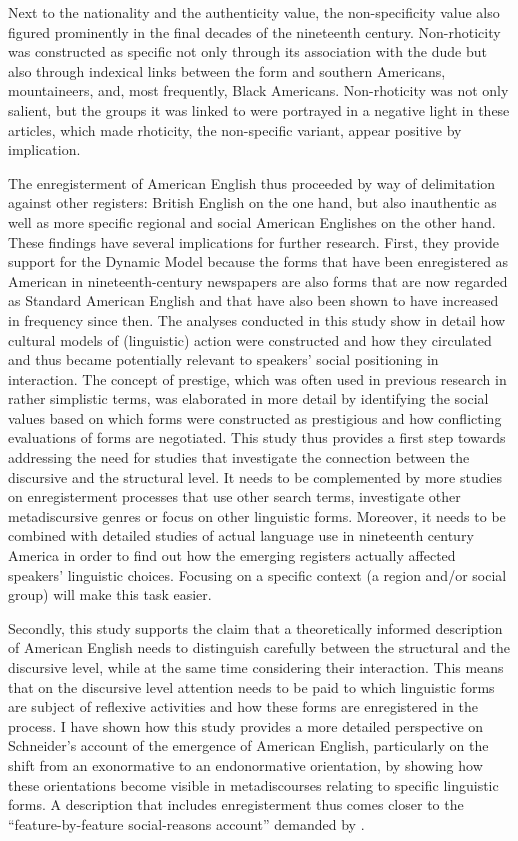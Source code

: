Next to the nationality and the authenticity value, the non-specificity value also figured prominently in the final decades of the nineteenth century. Non-rhoticity was constructed as specific not only through its association with the dude but also through indexical links between the form and southern Americans, mountaineers, and, most frequently, Black Americans. Non-rhoticity was not only salient, but the groups it was linked to were portrayed in a negative light in these articles, which made rhoticity, the non-specific variant, appear positive by implication.

The enregisterment of American English thus proceeded by way of delimitation against other registers: British English on the one hand, but also inauthentic as well as more specific regional and social American Englishes on the other hand. These findings have several implications for further research. First, they provide support for the Dynamic Model because the forms that have been enregistered as American in nineteenth-century newspapers are also forms that are now regarded as Standard American English and that have also been shown to have increased in frequency since then. The analyses conducted in this study show in detail how cultural models of (linguistic) action were constructed and how they circulated and thus became potentially relevant to speakers’ social positioning in interaction. The concept of prestige, which was often used in previous research in rather simplistic terms, was elaborated in more detail by identifying the social values based on which forms were constructed as prestigious and how conflicting evaluations of forms are negotiated. This study thus provides a first step towards addressing the need for studies that investigate the connection between the discursive and the structural level. It needs to be complemented by more studies on enregisterment processes that use other search terms, investigate other metadiscursive genres or focus on other linguistic forms. Moreover, it needs to be combined with detailed studies of actual language use in nineteenth century America in order to find out how the emerging registers actually affected speakers’ linguistic choices. Focusing on a specific context (a region and/or social group) will make this task easier.

Secondly, this study supports the claim that a theoretically informed description of American English needs to distinguish carefully between the structural and the discursive level, while at the same time considering their interaction. This means that on the discursive level attention needs to be paid to which linguistic forms are subject of reflexive activities and how these forms are enregistered in the process. I have shown how this study provides a more detailed perspective on Schneider’s account of the emergence of American English, particularly on the shift from an exonormative to an endonormative orientation, by showing how these orientations become visible in metadiscourses relating to specific linguistic forms. A description that includes enregisterment thus comes closer to the “feature-by-feature social-reasons account” demanded by \citet[279]{Trudgill2008b}.


